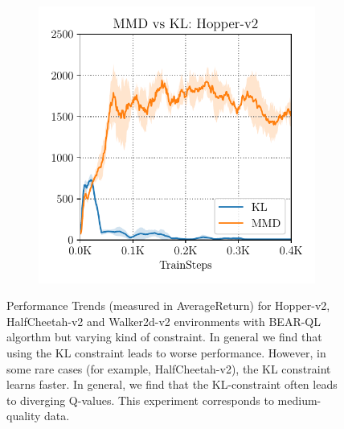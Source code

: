 \begin{figure}[t]
\begin{subfigure}[t]{0.31\textwidth}
    \end{subfigure}%
    ~
    \begin{subfigure}[t]{0.31\textwidth}
        \centering
        \includegraphics[width=0.99\linewidth]{chapters/bear/images/kl_vs_mmd_hopper_old.pdf}
    \end{subfigure}%
    \caption{Performance Trends (measured in AverageReturn) for Hopper-v2, HalfCheetah-v2 and Walker2d-v2 environments with BEAR-QL algorthm but varying kind of constraint. In general we find that using the KL constraint leads to worse performance. However, in some rare cases (for example, HalfCheetah-v2), the KL constraint learns faster. In general, we find that the KL-constraint often leads to diverging Q-values. This experiment corresponds to medium-quality data.}
    \label{fig:kl_vs_mmd_single}
\end{figure}

